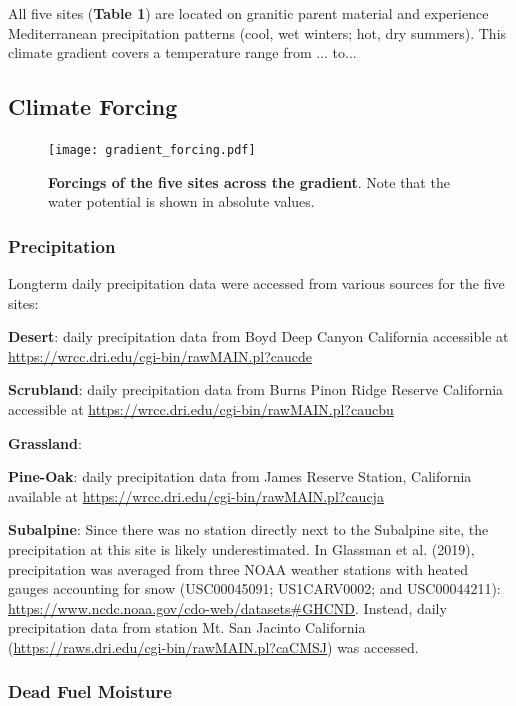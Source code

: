 \documentclass[letterpaper, 10pt]{article}
\begin{document}
All five sites (\textbf{Table 1}) are located on granitic parent material and experience Mediterranean precipitation patterns (cool, wet winters; hot, dry summers). This climate gradient covers a temperature range from ... to...



\subsection{\large Climate Forcing}

\begin{figure}[h]
\centering
      \texttt{[image: gradient\_forcing.pdf]}
      \caption{\textbf{Forcings of the five sites across the gradient}. Note that the water potential is shown in absolute values.}
      \label{fig: figure 2}
\end{figure}

\subsubsection{Precipitation}
Longterm daily precipitation data were accessed from various sources for the five sites:

\textbf{Desert}: daily precipitation data from Boyd Deep Canyon California accessible at \url{https://wrcc.dri.edu/cgi-bin/rawMAIN.pl?caucde}

\textbf{Scrubland}: daily precipitation data from Burns Pinon Ridge Reserve California accessible at \url{https://wrcc.dri.edu/cgi-bin/rawMAIN.pl?caucbu}

\textbf{Grassland}:

\textbf{Pine-Oak}: daily precipitation data from James Reserve Station, California available at \url{https://wrcc.dri.edu/cgi-bin/rawMAIN.pl?caucja}

\textbf{Subalpine}: Since there was no station directly next to the Subalpine site, the precipitation at this site is likely underestimated. In Glassman et al. (2019), precipitation was averaged from three NOAA weather stations with heated gauges accounting for snow (USC00045091; US1CARV0002; and USC00044211): \url{https://www.ncdc.noaa.gov/cdo-web/datasets#GHCND}. Instead, daily precipitation data from station Mt. San Jacinto California (\url{https://raws.dri.edu/cgi-bin/rawMAIN.pl?caCMSJ}) was accessed.

\subsubsection{Dead Fuel Moisture}
\end{document}
